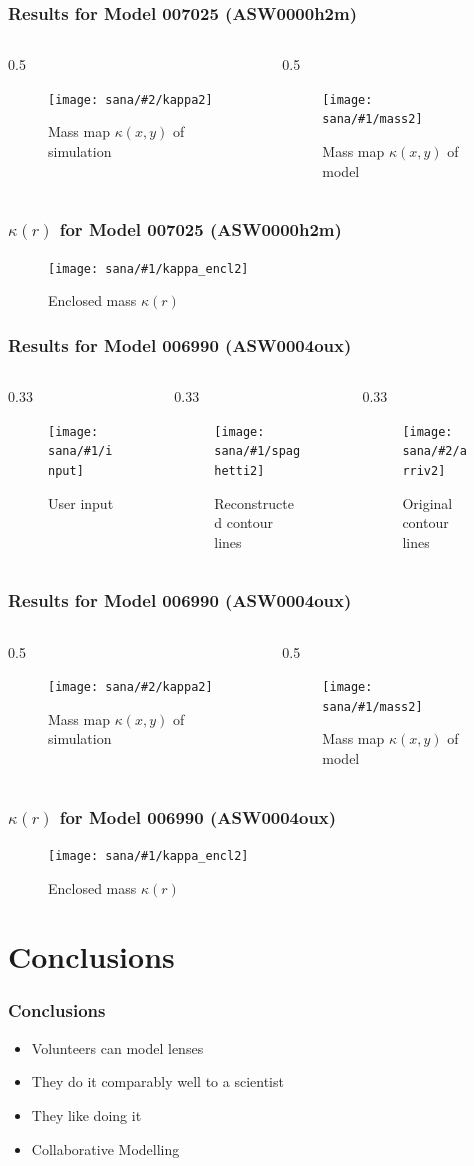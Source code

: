 \documentclass[aspectratio=1610]{beamer}
\newcommand{\resframea}[2]{
\begin{frame}
  \frametitle{Results for Model #1 (#2)}
  \begin{columns}[T]\begin{column}{0.33\textwidth}
    \begin{figure}
      \texttt{[image: sana/\#1/input]}
      \caption{User input}
    \end{figure}
  \end{column}\begin{column}{0.33\textwidth}
    \begin{figure}
      \texttt{[image: sana/\#1/spaghetti2]}
      \caption{Reconstructed contour lines}
    \end{figure}
  \end{column}\begin{column}{0.33\textwidth}
    \begin{figure}
      \texttt{[image: sana/\#2/arriv2]}
      \caption{Original contour lines}
    \end{figure}
  \end{column}\end{columns}
\end{frame}
}
\newcommand{\resframeb}[2]{
\begin{frame}
  \frametitle{Results for Model #1 (#2)}
  \begin{columns}[T]\begin{column}{0.5\textwidth}
    \begin{figure}
      \texttt{[image: sana/\#2/kappa2]}
      \caption{Mass map $\kappa\left(x,y\right)$ of simulation}
    \end{figure}
  \end{column}\begin{column}{0.5\textwidth}
    \begin{figure}
      \texttt{[image: sana/\#1/mass2]}
      \caption{Mass map $\kappa\left(x,y\right)$ of model}
    \end{figure}
  \end{column}
  \end{columns}
\end{frame}

\begin{frame}
  \frametitle{$\kappa\left(r\right)$ for Model #1 (#2)}
    \begin{figure}
      \texttt{[image: sana/\#1/kappa\_encl2]}
      \caption{Enclosed mass $\kappa\left(r\right)$}
    \end{figure}
\end{frame}
}
\begin{document}
\resframeb{007025}{ASW0000h2m}
%


\resframea{006990}{ASW0004oux}
\resframeb{006990}{ASW0004oux}





\section*{Conclusions}

\begin{frame}
  \frametitle{Conclusions}
  \begin{itemize}
    \item Volunteers can model lenses
    \item They do it comparably well to a scientist
    \item They like doing it
    \item Collaborative Modelling
  \end{itemize}
\end{frame}
\end{document}
